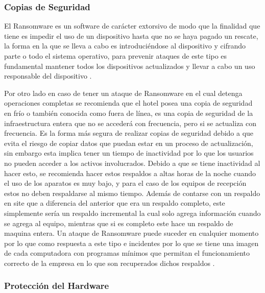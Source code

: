 \documentclass[10pt]{article}
\begin{document}
\subsubsection{Copias de Seguridad}
El Ransomware es un software de carácter extorsivo de modo que la finalidad que tiene es impedir el uso de un dispositivo hasta que no se haya pagado un rescate, la forma en la que se lleva a cabo es introduciéndose al dispositivo y cifrando parte o todo el sistema operativo, para prevenir ataques de este tipo es fundamental mantener todos los dispositivos actualizados y llevar a cabo un uso responsable del dispositivo \cite{ref1}.

Por otro lado en caso de tener un ataque de Ransomware en el cual detenga operaciones completas se recomienda que el hotel posea una copia de seguridad en frío o también conocida como fuera de línea, es una copia de seguridad de la infraestructura entera que no se accederá con frecuencia, pero si se actualiza con frecuencia. Es la forma más segura de realizar copias de seguridad debido a que evita el riesgo de copiar datos que puedan estar en un proceso de actualización, sin embargo esta implica tener un tiempo de inactividad por lo que los usuarios no pueden acceder a los activos involucrados. Debido a que se tiene inactividad al hacer esto, se recomienda hacer estos respaldos a altas horas de la noche cuando el uso de los aparatos es muy bajo, y para el caso de los equipos de recepción estos no deben respaldarse al mismo tiempo. Además de contarse con un respaldo en site que a diferencia del anterior que era un respaldo completo, este simplemente sería un respaldo incremental la cual solo agrega información cuando se agrega al equipo, mientras que si es completo este hace un respaldo de maquina entera. Un ataque de Ransomware puede suceder en cualquier momento por lo que como respuesta a este tipo e incidentes por lo que se tiene una imagen de cada computadora con programas mínimos que permitan el funcionamiento correcto de la empresa en lo que son recuperados dichos respaldos \cite{ref2}. 

\subsubsection{Protección del Hardware}
\end{document}
